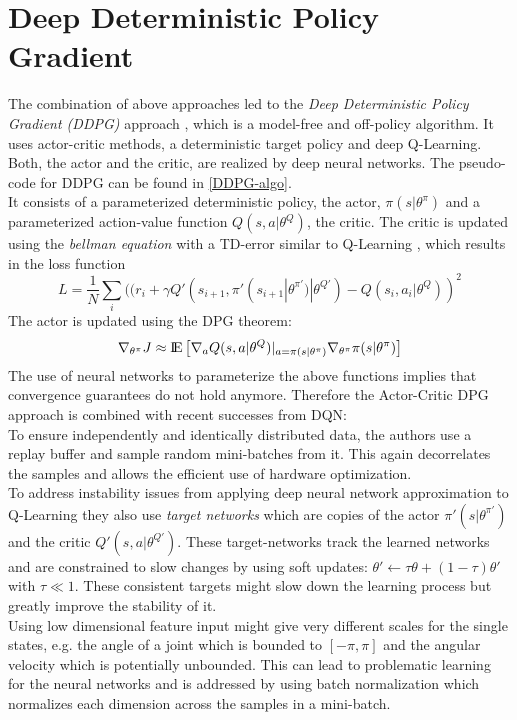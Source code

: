 \section{Deep Deterministic Policy Gradient}
\label{sec:DDPG}
The combination of above approaches led to the \textit{Deep Deterministic Policy Gradient (DDPG)} approach \citep{lillicrap2015continuous}, which is a model-free and off-policy algorithm. It uses actor-critic methods, a deterministic target policy and deep Q-Learning. Both, the actor and the critic, are realized by deep neural networks. The pseudo-code for DDPG can be found in \ref{DDPG-algo}.\\
It consists of a parameterized deterministic policy, the actor, $\pi(s|\theta^\pi)$ and a parameterized action-value function $Q(s,a|\theta^Q)$, the critic. The critic is updated using the \textit{bellman equation} with a TD-error similar to Q-Learning \citep{watkins1992q}, which results in the loss function
\[
L=\frac{1}{N}\sum_i((r_i + \gamma Q'(s_{i+1}, \pi'(s_{i+1}|\theta^{\pi'})|\theta^{Q'}) - Q(s_i,a_i|\theta^Q))^2
\]
The actor is updated using the DPG theorem:
\[
\nabla_{\theta^\pi}J\approx {\rm I\!E}\left[\nabla_aQ(s,a|\theta^Q)|_{a=\pi(s|\theta^\pi)} \nabla_{\theta^\pi}\pi(s|\theta^\pi)\right]
\]
The use of neural networks to parameterize the above functions implies that convergence guarantees do not hold anymore. Therefore the Actor-Critic DPG approach is combined with recent successes from DQN:\\
To ensure independently and identically distributed data, the authors use a replay buffer and sample random mini-batches from it. This again decorrelates the samples and allows the efficient use of hardware optimization.\\
To address instability issues from applying deep neural network approximation to Q-Learning they also use \textit{target networks} which are copies of the actor $\pi'(s|\theta^{\pi'})$ and the critic $Q'(s,a|\theta^{Q'})$. These target-networks track the learned networks and are constrained to slow changes by using soft updates: $\theta' \leftarrow \tau\theta + (1-\tau)\theta'$ with $\tau \ll 1$. These consistent targets might slow down the learning process but greatly improve the stability of it.\\
Using low dimensional feature input might give very different scales for the single states, e.g. the angle of a joint which is bounded to $[-\pi, \pi]$ and the angular velocity which is potentially unbounded. This can lead to problematic learning for the neural networks and is addressed by using batch normalization which normalizes each dimension across the samples in a mini-batch.\\
